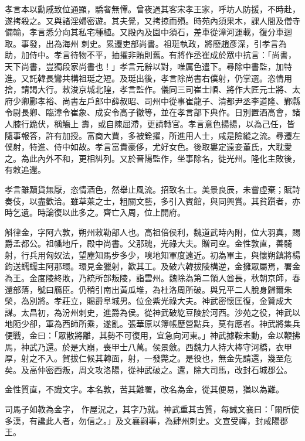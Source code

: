 \begin{pinyinscope}
 孝言本以勳戚致位通顯，驕奢無憚。曾夜過其客宋孝王家，呼坊人防援，不時赴，遂拷殺之。又與諸淫婦密遊。其夫覺，又拷掠而殞。時苑內須果木，課人間及僧寺備輸，孝言悉分向其私宅種植。又殿內及園中須石，差車從漳河運載，復分車迴取。事發，出為海州
 刺史。累遷吏部尚書。祖珽執政，將廢趙彥深，引孝言為助，加侍中。孝言待物不平，抽擢非賄則舊。有將作丞崔成於眾中抗言：「尚書，天下尚書，豈獨段家尚書也！」孝言元辭以對，唯厲色遣下。尋除中書監，加特進。又託韓長鸞共構祖珽之短。及珽出後，孝言除尚書右僕射，仍掌選。恣情用捨，請謁大行。敕浚京城北隍，孝言監作。儀同三司崔士順、將作大匠元士將、太府少卿酈孝裕、尚書左戶郎中薛叔昭、司州中從事崔龍子、清都尹丞李道隆、鄴縣令尉長卿、臨漳令崔象、成安令高子徹等，並在孝言部下典作。日別置酒高會，諸人膝行跪伏，稱觴上
 壽，或自陳屈滯，更請轉官。孝言意色揚揚，以為己任，皆隨事報答，許有加授。富商大賈，多被銓擢，所進用人士，咸是險縱之流。尋遷左僕射，特進、侍中如故。孝言富貴豪侈，尤好女色。後取婁定遠妾董氏，大耽愛之。為此內外不和，更相糾列。又於晉陽監作，坐事除名，徙光州。隆化主敗後，有敕追還。



 孝言雖黷貨無厭，恣情酒色，然舉止風流。招致名士。美景良辰，未嘗虛棄；賦詩奏伎，以盡歡洽。雖草萊之士，粗關文藝，多引入賓館，與同興賞。其貧躓者，亦時乞遺。時論復以此多之。齊亡入周，位上開府。



 斛律金，字阿六敦，朔州敕勒部人也。高祖倍侯利，魏道武時內附，位大羽真，賜爵孟都公。祖幡地斤，殿中尚書。父那瑰，光祿大夫。贈司空。金性敦直，善騎射，行兵用匈奴法，望塵知馬步多少，嗅地知軍度遠近。初為軍主，與懷朔鎮將楊鈞送蠕蠕主阿那環。環見金獵射，歎其工。及破六韓拔陵構逆，金擁眾屬焉，署金為王。金度陵終敗，乃統所部叛陵，詣雲州。魏除為第二領人酋長，秋朝京師，春還部落，號曰鴈臣。仍稍引南出黃瓜堆，為杜洛周所破。與兄平二人脫身歸爾朱榮，為別將。孝莊立，賜爵阜城男。位金紫光祿大夫。神武密懷匡復，金贊成大
 謀。太昌初，為汾州刺史，進爵為侯。從神武破紇豆陵於河西。沙苑之役，神武以地阨少卻，軍為西師所乘，遂亂。張華原以簿帳歷營點兵，莫有應者。神武將集兵便戰，金曰：「眾散將離，其勢不可復用，宜急向河東。」神武據鞍未動，金以鞭拂馬，神武乃還。於是大崩，喪甲士八萬。侯景斂。西魏力人持大棒守河橋，衣甲厚，射之不入。賀拔仁候其轉面，射，一發斃之。是役也，無金先請還，幾至危矣。及高仲密西叛，周文攻洛陽，從神武破之。還，除大司馬，改封石城郡公。



 金性質直，不識文字。本名敦，苦其難署，改名為金，從其便易，猶以為難。



 司馬子如教為金字，
 作屋況之，其字乃就。神武重其古質，每誡文襄曰：「爾所使多漢，有讒此人者，勿信之。」及文襄嗣事，為肆州刺史。文宣受禪，封咸陽郡王。




\end{pinyinscope}
